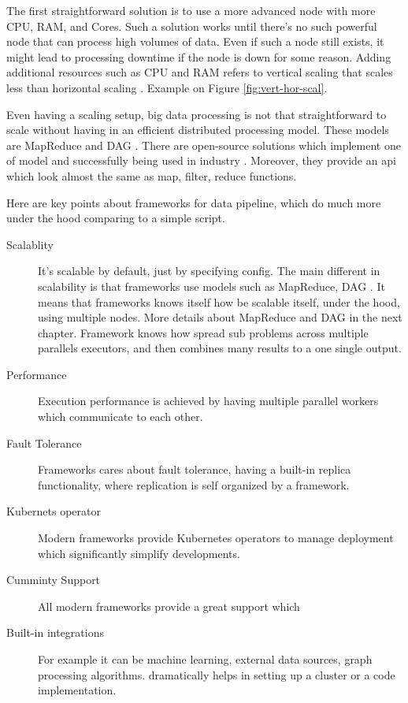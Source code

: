 The first straightforward solution is to use a more advanced node \cite{aws_node_types} with more CPU, RAM, and Cores.
Such a solution works until there's no such powerful node that can process high volumes of data.
Even if such a node still exists, it might lead to processing downtime if the node is down for some reason.
Adding additional resources such as CPU and RAM refers to vertical scaling that scales less than horizontal scaling \cite{vertical_horizontal_scalling_1}.
Example on Figure \ref{fig:vert-hor-scal}.

Even having a scaling setup, big data processing is not that straightforward to scale without having
in an efficient distributed processing model.
These models are MapReduce \cite{map_reduce_google} \cite{map_reduce_2} \cite{map_reduce_3} and DAG \cite{flink_dag} \cite{kafka_streams_topology}.
There are open-source solutions which implement one of model and successfully being used in industry \cite{flinkPoweredBy} \cite{netflixStreamingSQL}.
Moreover, they provide an api which
look almost the same as map, filter, reduce functions.

Here are key points about frameworks for data pipeline, which do much more under
the hood comparing to a simple script.

\begin{description}
    \item[Scalablity] It's scalable by default, just by specifying config.
    The main different in scalability is that frameworks use models such as
    MapReduce, DAG \cite{map_reduce}.
    It means that frameworks knows itself how be scalable itself, under the hood,
    using multiple nodes.
    More details about MapReduce and DAG in the next chapter.
    Framework knows how spread sub problems across multiple parallels executors,
    and then combines many results to a one single output.
    \item[Performance] Execution performance is achieved by having multiple
    parallel workers which communicate to each other.
    \item[Fault Tolerance] Frameworks cares about fault tolerance, having a built-in replica
    functionality, where replication is self organized by a framework.
    \item[Kubernets operator] Modern frameworks provide Kubernetes operators to
    manage deployment which significantly simplify developments.
    \item[Cumminty Support] All modern frameworks provide a great support which
    \item [Built-in integrations] For example it can be machine learning, external data sources,
    graph processing algorithms.
    dramatically helps in setting up a cluster or a code implementation.
\end{description}

